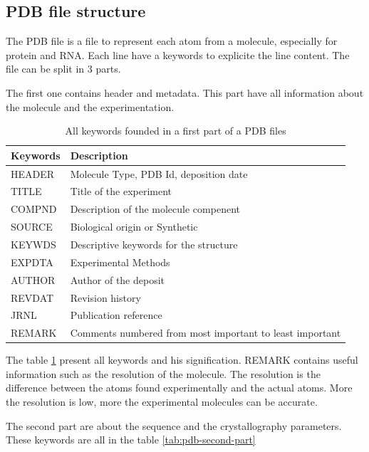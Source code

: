 \documentclass[11pt,a4paper]{article}
\begin{document}
\subsection{PDB file structure}
The PDB file is a file to represent each atom from a molecule, especially for protein and RNA. Each line have a keywords to explicite the line content. The file can be split in 3 parts. 

The first one contains header and metadata. This part have all information about the molecule and the experimentation.
\begin{table}[h!]
\centering
\small
\setlength{\tabcolsep}{4pt}
\begin{tabularx}{\textwidth}{|>{\raggedright\arraybackslash}p{2.5cm}|>{\centering\arraybackslash}X|}
\hline
Keywords & Description                            \\ \hline \hline
HEADER   & Molecule Type, PDB Id, deposition date \\
TITLE    & Title of the experiment                \\
COMPND   & Description of the molecule compenent  \\ 
SOURCE   & Biological origin or Synthetic \\
KEYWDS & Descriptive keywords for the structure \\
EXPDTA & Experimental Methods \\
AUTHOR & Author of the deposit \\
REVDAT & Revision history \\
JRNL & Publication reference \\
REMARK & Comments numbered from most important to least important \\
\hline
\end{tabularx}%
\caption{All keywords founded in a first part of a PDB files}
\label{tab:pdb-first-part}
\end{table}

The table \ref{tab:pdb-first-part} present all keywords and his signification. REMARK contains useful information such as the resolution of the molecule. The resolution is the difference between the atoms found experimentally and the actual atoms. More the resolution is low, more the experimental molecules can be accurate. 

The second part are about the sequence and the crystallography parameters. These keywords are all in the table \ref{tab:pdb-second-part} 
\end{document}
